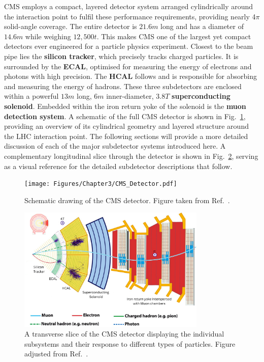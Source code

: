 \ac{CMS} employs a compact, layered detector system arranged cylindrically around the interaction point to fulfil these performance requirements, providing nearly 4$\pi$ solid-angle coverage. The entire detector is $21.6\unit{m}$ long and has a diameter of $14.6\unit{m}$ while weighing $12,500\unit{t}$. This makes \ac{CMS} one of the largest yet compact detectors ever engineered for a particle physics experiment. Closest to the beam pipe lies the \textbf{silicon tracker}, which precisely tracks charged particles. It is surrounded by the \textbf{\ac{ECAL}}, optimised for measuring the energy of electrons and photons with high precision. The \textbf{\ac{HCAL}} follows and is responsible for absorbing and measuring the energy of hadrons. These three subdetectors are enclosed within a powerful $13\unit{m}$ long, $6\unit{m}$ inner-diameter, $3.8\unit{T}$ \textbf{superconducting solenoid}. Embedded within the iron return yoke of the solenoid is the \textbf{muon detection system}. A schematic of the full \ac{CMS} detector is shown in Fig.~\ref{Figure:Chapter3_CMS_schematic}, providing an overview of its cylindrical geometry and layered structure around the \ac{LHC} interaction point. The following sections will provide a more detailed discussion of each of the major subdetector systems introduced here. A complementary longitudinal slice through the detector is shown in Fig.~\ref{Figure:Chapter3_CMS_slice}, serving as a visual reference for the detailed subdetector descriptions that follow.

\begin{figure}[!htbp]
\centering
\texttt{[image: Figures/Chapter3/CMS\_Detector.pdf]}
\caption[Schematic drawing of the CMS detector]{Schematic drawing of the \ac{CMS} detector. Figure taken from Ref.~\cite{CMS_Detector_Run3}.}
\label{Figure:Chapter3_CMS_schematic}
\end{figure}

\begin{figure}[!htbp]
\centering
\includegraphics[width= 0.8\textwidth]{Figures/Chapter3/CMS_Detector_Slice.pdf}
\caption[Transverse slice of the CMS detector]{A transverse slice of the \ac{CMS} detector displaying the individual subsystems and their response to different types of particles. Figure adjusted from Ref.~\cite{CMS_Detector_Slice}.}
\label{Figure:Chapter3_CMS_slice}
\end{figure}

